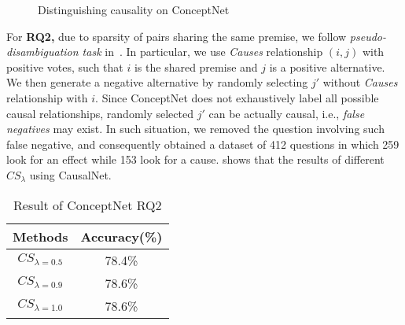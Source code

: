 \begin{figure}[htb]
\centering
{}
\caption{Distinguishing causality on ConceptNet}
\label{fig:conceptApp1}
\end{figure}

For {\bf RQ2,} 
due to sparsity of pairs sharing the same premise,
we follow \emph{pseudo-disambiguation task} in~\cite{Erk}.
In particular, we use \emph{Causes} relationship $(i,j)$ with
positive votes, such that $i$ is the shared premise and $j$ is a
positive alternative. We then generate a negative alternative by
randomly selecting $j'$ without \emph{Causes} relationship with $i$.
Since ConceptNet does not exhaustively
label all possible causal relationships, randomly selected $j'$ can
be actually causal, i.e., \emph{false negatives} may exist. In such
situation, we removed the question involving such false negative,
and consequently obtained a dataset of 412 questions in which 259
look for an effect while 153 look for a cause. 
shows that the results of different $CS_\lambda$ 
using CausalNet.

\begin{table}[th]
\centering
\caption{Result of ConceptNet RQ2}
\begin{tabular}{cc}
\hline
Methods & Accuracy(\%) \\
\hline
$CS_{\lambda=0.5}$ & 78.4\%  \\
$CS_{\lambda=0.9}$ & 78.6\%  \\
$CS_{\lambda=1.0}$ & 78.6\%  \\
\hline
\end{tabular}
\label{tab:rq2}
\end{table}


